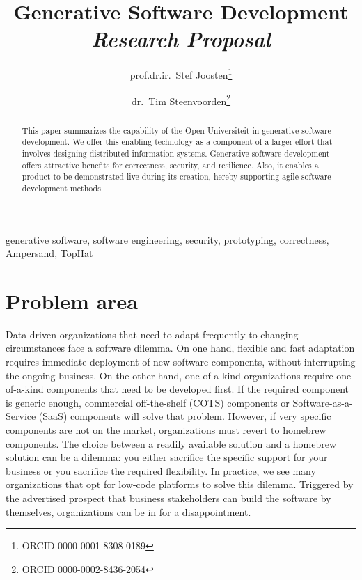\documentclass{elsarticle}
\begin{document}
% 

\title{Generative Software Development\\{\em\normalsize Research Proposal}}
\author{prof.dr.ir.\ Stef Joosten\footnote{ORCID 0000-0001-8308-0189}}
\author{dr.\ Tim Steenvoorden\footnote{ORCID 0000-0002-8436-2054}}
\address{Open Universiteit Nederland, Heerlen, the Netherlands}

\begin{abstract}
    This paper summarizes the capability of the Open Universiteit in generative software development.
    We offer this enabling technology as a component of a larger effort that involves designing distributed information systems.
    Generative software development offers attractive benefits for correctness, security, and resilience.
    Also, it enables a product to be demonstrated live during its creation,
    hereby supporting agile software development methods.
\end{abstract}

\begin{keyword}
    generative software, software engineering, security, prototyping, correctness, Ampersand, TopHat
\end{keyword}
\maketitle

\section{Problem area}
   Data driven organizations that need to adapt frequently to changing circumstances face a software dilemma.
   On one hand, flexible and fast adaptation requires immediate deployment of new software components, without interrupting the ongoing business.
   On the other hand, one-of-a-kind organizations require one-of-a-kind components that need to be developed first.
   If the required component is generic enough, commercial off-the-shelf (COTS) components or Software-as-a-Service (SaaS) components will solve that problem.
   However, if very specific components are not on the market, organizations must revert to homebrew components.
   The choice between a readily available solution and a homebrew solution can be a dilemma:
   you either sacrifice the specific support for your business or you sacrifice the required flexibility.
   In practice, we see many organizations that opt for low-code platforms to solve this dilemma.
   Triggered by the advertised prospect that business stakeholders can build the software by themselves,
   organizations can be in for a disappointment.
\end{document}
